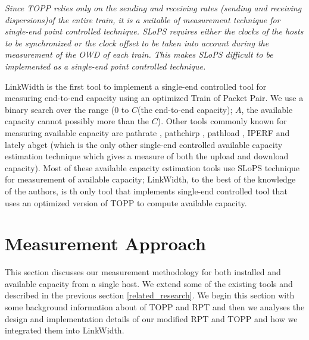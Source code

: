 {\em Since TOPP relies only on the sending and receiving rates
(sending and receiving dispersions)of the entire train, it is a
suitable of measurement technique for single-end point controlled
technique. SLoPS requires either the clocks of the hosts to be
synchronized or the clock offset to be taken into account during the
measurement of the OWD of each train. This makes SLoPS difficult to be
implemented as a single-end point controlled technique.}


LinkWidth is the first tool to implement a single-end controlled tool
for measuring end-to-end capacity using an optimized Train of Packet
Pair. We use a binary search over the range ($0$ to $C$(the end-to-end
capacity); $A$, the available capacity cannot possibly more than the
$C$). Other tools commonly known for measuring available capacity are
pathrate \cite{ton_dispersion}, pathchirp \cite{pathchirp}, pathload
\cite{jain02endtoend}, IPERF and lately abget \cite{dovrolis_markatos}
(which is the only other single-end controlled available capacity
estimation technique which gives a measure of both the upload and
download capacity). Most of these available capacity estimation tools
use SLoPS technique for measurement of available capacity; LinkWidth,
to the best of the knowledge of the authors, is th only tool that
implements single-end controlled tool that uses an optimized version
of TOPP to compute available capacity.


\section{Measurement Approach}

This section discusses our measurement methodology for both installed
and available capacity from a single host. We extend some of the
existing tools and described in the previous section
\ref{related_research}. We begin this section with some background
information about of TOPP and RPT and then we analyses the design and
implementation details of our modified RPT and TOPP and how we
integrated them into LinkWidth.

